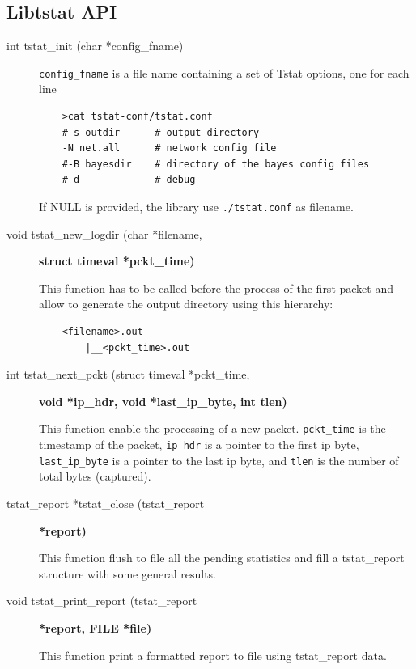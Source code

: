 \documentclass[11pt]{article}
\begin{document}
\subsection{Libtstat API\label{Libtstat_API}}
\begin{description}

\item[{int tstat\_init (char *config\_fname)}] \mbox{}

\texttt{config\_fname} is a file name containing a set of Tstat options, one 
for each line

\begin{small}\begin{verbatim}
    >cat tstat-conf/tstat.conf
    #-s outdir      # output directory
    -N net.all      # network config file 
    #-B bayesdir    # directory of the bayes config files
    #-d             # debug
\end{verbatim}\end{small} \noindent
If NULL is provided, the library use \texttt{./tstat.conf} as filename.


\item[{void tstat\_new\_logdir (char *filename,}] \textbf{struct timeval *pckt\_time)}

This function has to be called before the process of the first packet
and allow to generate the output directory using this hierarchy:

\begin{small}\begin{verbatim}
    <filename>.out
        |__<pckt_time>.out
\end{verbatim}\end{small} \noindent
\item[{int tstat\_next\_pckt (struct timeval *pckt\_time,}] \textbf{void *ip\_hdr, void *last\_ip\_byte, int tlen)}

This function enable the processing of a new packet.
\texttt{pckt\_time}  is the timestamp of the packet, \texttt{ip\_hdr} is a pointer to the first ip byte,
\texttt{last\_ip\_byte} is a pointer to the last ip byte, and \texttt{tlen} is the number of total bytes (captured).


\item[{tstat\_report *tstat\_close (tstat\_report}] \textbf{*report)}

This function flush to file all the pending statistics
and fill a tstat\_report structure with some general
results.


\item[{void tstat\_print\_report (tstat\_report}] \textbf{*report, FILE *file)}

This function print a formatted report to file
using tstat\_report data.

\end{description}
\end{document}
